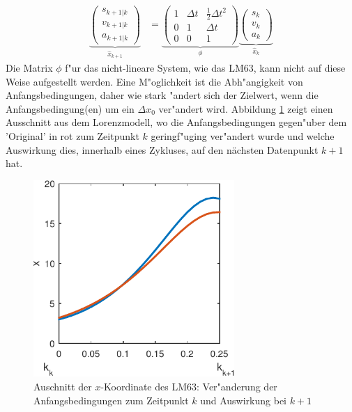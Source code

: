 \begin{refsection}
\begin{align}
\underbrace{\begin{pmatrix}
s_{k+1|k} \\ 
v_{k+1|k} \\ 
a_{k+1|k}
\end{pmatrix}}_{\hat{x}_{k+1}}
&=
\underbrace{\begin{pmatrix}
 1 & \Delta t & \frac{1}{2}\Delta t^{2} \\ 
 0 & 1 & \Delta t \\ 
 0 & 0 & 1
 \end{pmatrix}}_{\phi}
\underbrace{\begin{pmatrix}
   s_{k} \\ 
   v_{k} \\ 
   a_{k}
   \end{pmatrix}}_{\hat{x}_{k}}
\label{kalman:Posbest}
\end{align}
Die Matrix $\phi$ f"ur das nicht-lineare System, wie das LM63, kann nicht auf diese  Weise aufgestellt werden. Eine M"oglichkeit ist die Abh"angigkeit von Anfangsbedingungen, daher wie stark "andert sich der Zielwert, wenn die Anfangsbedingung(en) um ein $\Delta x_{0}$ ver"andert wird. Abbildung \ref{kalman:AblnachAnf} zeigt einen Ausschnitt aus dem Lorenzmodell, wo die Anfangsbedingungen gegen"uber dem 'Original' in rot zum Zeitpunkt $k$ geringf"uging ver"andert wurde und welche Auswirkung dies, innerhalb eines Zykluses, auf den nächsten Datenpunkt $k+1$ hat.

\begin{figure}
\centering
\includegraphics[width=3in]{kalman/figures/ablnachAnf2.pdf}
\caption{Auschnitt der $x$-Koordinate des LM63: Ver"anderung der Anfangsbedingungen zum Zeitpunkt $k$ und Auswirkung bei $k+1$}
\label{kalman:AblnachAnf}
\end{figure}


\end{refsection}
